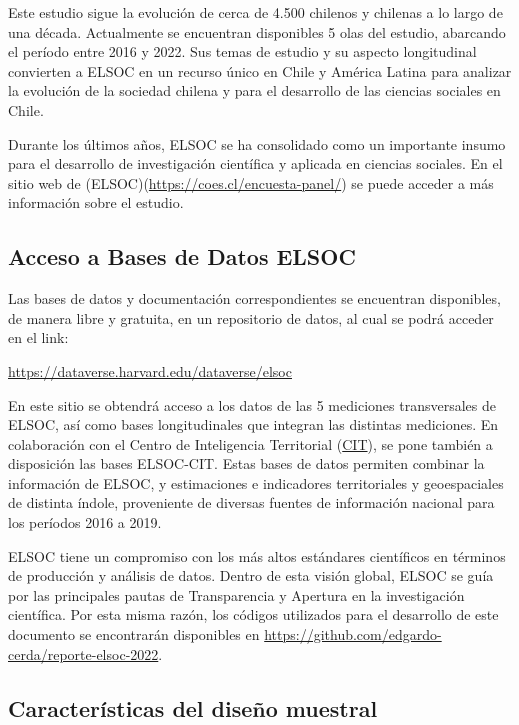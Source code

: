 \documentclass[
  12pt,
]{book}
\begin{document}
Este estudio sigue la evolución de cerca de 4.500 chilenos y chilenas a lo largo de una década. Actualmente se encuentran disponibles 5 olas del estudio, abarcando el período entre 2016 y 2022. Sus temas de estudio y su aspecto longitudinal convierten a ELSOC en un recurso único en Chile y América Latina para analizar la evolución de la sociedad chilena y para el desarrollo de las ciencias sociales en Chile.

Durante los últimos años, ELSOC se ha consolidado como un importante insumo para el desarrollo de investigación científica y aplicada en ciencias sociales. En el sitio web de (ELSOC)(\url{https://coes.cl/encuesta-panel/}) se puede acceder a más información sobre el estudio.

\hypertarget{acceso-a-bases-de-datos-elsoc}{%
\subsection*{Acceso a Bases de Datos ELSOC}\label{acceso-a-bases-de-datos-elsoc}}

Las bases de datos y documentación correspondientes se encuentran disponibles, de manera libre y gratuita, en un repositorio de datos, al cual se podrá acceder en el link:

\url{https://dataverse.harvard.edu/dataverse/elsoc}

En este sitio se obtendrá acceso a los datos de las 5 mediciones transversales de ELSOC, así como bases longitudinales que integran las distintas mediciones. En colaboración con el Centro de Inteligencia Territorial (\href{https://cit.uai.cl/}{CIT}), se pone también a disposición las bases ELSOC-CIT. Estas bases de datos permiten combinar la información de ELSOC, y estimaciones e indicadores territoriales y geoespaciales de distinta índole, proveniente de diversas fuentes de información nacional para los períodos 2016 a 2019.

ELSOC tiene un compromiso con los más altos estándares científicos en términos de producción y análisis de datos. Dentro de esta visión global, ELSOC se guía por las principales pautas de Transparencia y Apertura en la investigación científica. Por esta misma razón, los códigos utilizados para el desarrollo de este documento se encontrarán disponibles en \url{https://github.com/edgardo-cerda/reporte-elsoc-2022}.

\hypertarget{caracteruxedsticas-del-diseuxf1o-muestral}{%
\subsection*{Características del diseño muestral}\label{caracteruxedsticas-del-diseuxf1o-muestral}}
\end{document}
